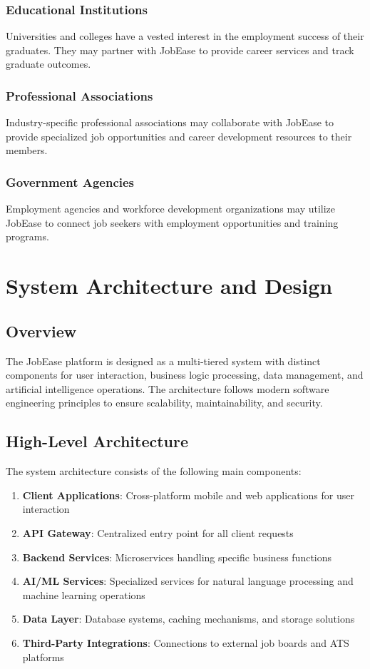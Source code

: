 \documentclass[12pt,a4paper]{report}
\begin{document}
\subsection{Educational Institutions}
Universities and colleges have a vested interest in the employment success of their graduates. They may partner with JobEase to provide career services and track graduate outcomes.

\subsection{Professional Associations}
Industry-specific professional associations may collaborate with JobEase to provide specialized job opportunities and career development resources to their members.

\subsection{Government Agencies}
Employment agencies and workforce development organizations may utilize JobEase to connect job seekers with employment opportunities and training programs.

\chapter{System Architecture and Design}

\section{Overview}
The JobEase platform is designed as a multi-tiered system with distinct components for user interaction, business logic processing, data management, and artificial intelligence operations. The architecture follows modern software engineering principles to ensure scalability, maintainability, and security.

\section{High-Level Architecture}
The system architecture consists of the following main components:

\begin{enumerate}[leftmargin=2em]
  \item \textbf{Client Applications}: Cross-platform mobile and web applications for user interaction
  \item \textbf{API Gateway}: Centralized entry point for all client requests
  \item \textbf{Backend Services}: Microservices handling specific business functions
  \item \textbf{AI/ML Services}: Specialized services for natural language processing and machine learning operations
  \item \textbf{Data Layer}: Database systems, caching mechanisms, and storage solutions
  \item \textbf{Third-Party Integrations}: Connections to external job boards and ATS platforms
\end{enumerate}
\end{document}
